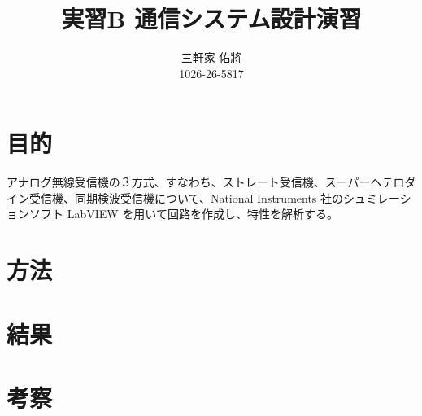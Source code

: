 \documentclass[11pt]{ujarticle}
\title{実習B 通信システム設計演習}
\author{三軒家 佑將 \\ 1026-26-5817}
\date{}
\begin{document}
\maketitle

\section{目的}
	アナログ無線受信機の３方式、すなわち、ストレート受信機、スーパーヘテロダイン受信機、同期検波受信機について、National Instruments 社のシュミレーションソフト LabVIEW を用いて回路を作成し、特性を解析する。
\section{方法} %
\section{結果} %
\section{考察}
\end{document}
